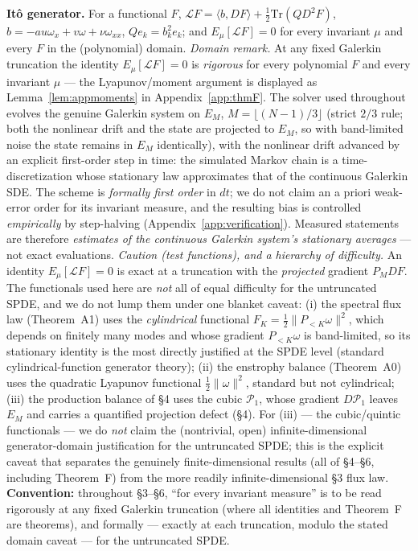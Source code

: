 \documentclass[11pt]{article}
\theoremstyle{remark}
\theoremstyle{plain}
\begin{document}
\textbf{It\^o generator.} For a functional $F$, $\mathcal{L}F = \langle b, DF\rangle + \tfrac12 \mathrm{Tr}(Q D^2F)$,
$b = -au\omega_x + v\omega + \nu\omega_{xx}$, $Qe_k = b_k^2 e_k$; and $E_\mu[\mathcal{L}F] = 0$ for every
invariant $\mu$ and every $F$ in the (polynomial) domain. \emph{Domain remark.}
At any fixed Galerkin truncation the identity
$E_\mu[\mathcal{L}F]=0$ is \emph{rigorous} for every polynomial $F$ and every
invariant $\mu$ --- the Lyapunov/moment argument is displayed as
Lemma~\ref{lem:appmoments} in Appendix~\ref{app:thmF}. The solver used
throughout evolves the genuine Galerkin system on $E_M$, $M = \lfloor (N-1)/3\rfloor$ (strict $2/3$ rule;
both the nonlinear drift and the state are projected to $E_M$, so with band-limited
noise the state remains in $E_M$ identically), with the nonlinear drift
advanced by an explicit first-order step in time: the simulated Markov chain is a
time-discretization whose stationary law approximates that of the continuous Galerkin
SDE. The scheme is \emph{formally first order} in $dt$; we do not claim an a priori
weak-error order for its invariant measure, and the resulting bias is controlled
\emph{empirically} by step-halving (Appendix~\ref{app:verification}). Measured statements are therefore
\emph{estimates of the continuous Galerkin system's stationary averages} --- not exact
evaluations. \emph{Caution (test functions), and a hierarchy of difficulty.} An identity
$E_\mu[\mathcal{L}F] = 0$ is exact at a truncation with the \emph{projected} gradient
$P_M DF$. The functionals used here are \emph{not} all of equal difficulty for the
untruncated SPDE, and we do not lump them under one blanket caveat:
(i) the spectral flux law (Theorem~A1) uses the \emph{cylindrical} functional
$F_K = \tfrac12\|P_{<K}\omega\|^2$, which depends on finitely many modes and whose gradient
$P_{<K}\omega$ is band-limited, so its stationary identity is the most directly justified at
the SPDE level (standard cylindrical-function generator theory);
(ii) the enstrophy balance (Theorem~A0) uses the quadratic Lyapunov functional
$\tfrac12\|\omega\|^2$, standard but not cylindrical;
(iii) the production balance of \S4 uses the cubic $\mathcal{P}_1$, whose gradient
$D\mathcal{P}_1$ leaves $E_M$ and carries a quantified projection defect (\S4).
For (iii) --- the cubic/quintic functionals --- we do \emph{not} claim the (nontrivial,
open) infinite-dimensional generator-domain justification for the untruncated SPDE; this is
the explicit caveat that separates the genuinely finite-dimensional results (all of
\S4--\S6, including Theorem~F) from the more readily infinite-dimensional \S3 flux law.
\textbf{Convention:}
throughout \S3--\S6, ``for every invariant measure'' is to be read rigorously at any
fixed Galerkin truncation (where all identities and Theorem~F are theorems), and
formally --- exactly at each truncation, modulo the stated domain caveat --- for
the untruncated SPDE.
\end{document}
